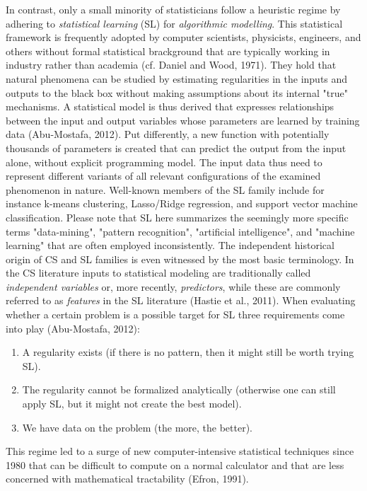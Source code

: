 \documentclass[authoryear,review,3p]{elsarticle}
\begin{document}
In contrast, only a small minority of statisticians
follow a heuristic regime by
adhering to \textit{statistical learning} (SL) for
\textit{algorithmic modelling}.
This statistical framework is frequently adopted by computer scientists,
physicists, engineers, and others without formal statistical brackground
that are typically working in industry
rather than academia (cf. Daniel and Wood, 1971).
%
They hold that natural phenomena
can be studied by estimating regularities in the inputs and
outputs to the black box without making assumptions
about its internal "true" mechanisms.
A statistical model is thus derived that expresses
relationships between the input and output variables
whose parameters are learned by training data (Abu-Mostafa, 2012).
Put differently, a new function with potentially thousands of
parameters is created
that can predict the output from the input alone,
without explicit programming model.
The input data thus need to represent different variants of
all relevant configurations of the examined phenomenon in nature.
Well-known members of
the SL family include for instance k-means clustering,
Lasso/Ridge regression, and support vector machine classification.
%
Please note that SL here summarizes the seemingly more specific terms
"data-mining", "pattern recognition", "artificial intelligence",
and "machine learning" that are often employed inconsistently.
The independent historical origin of CS and SL families is even
witnessed by the most basic terminology. 
In the CS literature inputs to statistical modeling
are traditionally called \textit{independent variables}
or, more recently, \textit{predictors},
while these are commonly referred to as \textit{features}
in the SL literature (Hastie et al., 2011).
%
When evaluating whether a certain problem is a possible target for SL
three requirements come into play (Abu-Mostafa, 2012):
\begin{enumerate}
  \item A regularity exists
(if there is no pattern, then it might still be worth trying SL).
  \item The regularity cannot be formalized analytically
(otherwise one can still apply SL, but it might not create the best model).
  \item We have data on the problem (the more, the better).
\end{enumerate}
%
This regime led to a surge of new
computer-intensive statistical techniques since 1980
that can be difficult to compute on a normal calculator
and
that are less concerned with mathematical tractability (Efron, 1991).
\end{document}
